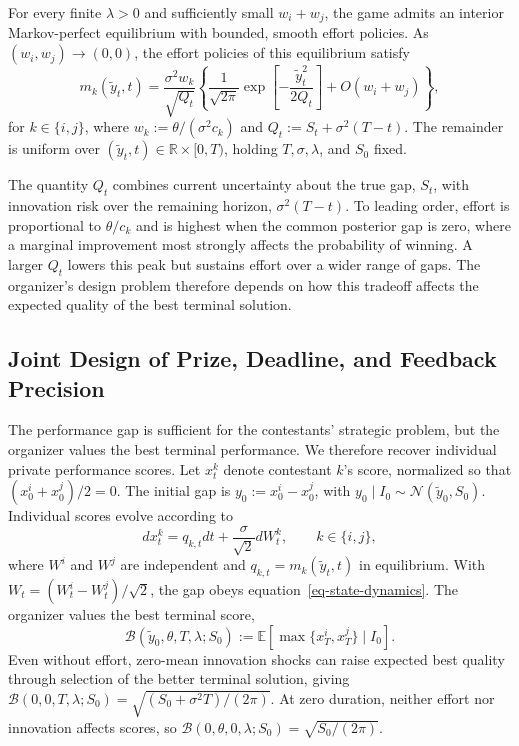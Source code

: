 \documentclass[mnsc]{informs3}
\begin{document}
\begin{theorem}\label{thm-equilibrium-effort}
{For every finite $\lambda>0$ and sufficiently small $w_i+w_j$, the game admits an interior Markov-perfect equilibrium with bounded, smooth effort policies. As $(w_i,w_j)\to(0,0)$, the effort policies of this equilibrium satisfy}
\begin{equation}\label{eq-equilibrium-effort}
m_k(\tilde y_t,t)
=\frac{\sigma^2w_k}{\sqrt{Q_t}}
\left\{
\frac{1}{\sqrt{2\pi}}
\exp\!\left[-\frac{\tilde y_t^2}{2Q_t}\right]
+O(w_i+w_j)
\right\},
\end{equation}
for $k\in\{i,j\}$, where $w_k:=\theta/(\sigma^2c_k)$ and $Q_t:=S_t+\sigma^2(T-t)$. The remainder is uniform over $(\tilde y_t,t)\in\mathbb R\times[0,T)$, holding $T,\sigma,\lambda$, and $S_0$ fixed.
\end{theorem}

{The quantity $Q_t$ combines current uncertainty about the true gap, $S_t$, with innovation risk over the remaining horizon, $\sigma^2(T-t)$. To leading order, effort is proportional to $\theta/c_k$ and is highest when the common posterior gap is zero, where a marginal improvement most strongly affects the probability of winning. A larger $Q_t$ lowers this peak but sustains effort over a wider range of gaps.}
The organizer's design problem therefore depends on how this tradeoff affects the expected quality of the best terminal solution.

\subsection{{Joint Design of Prize, Deadline, and Feedback Precision}}\label{sect-design}


The performance gap is sufficient for the contestants' strategic problem, but the organizer values the best terminal performance. We therefore recover individual private performance scores. Let $x_t^k$ denote contestant $k$'s score, normalized so that $(x_0^i+x_0^j)/2=0$. The initial gap is $y_0:=x_0^i-x_0^j$, with $y_0\mid I_0\sim\mathcal N(\tilde y_0,S_0)$.
Individual scores evolve according to
\begin{equation}\label{eq-individual-output-dynamics}
dx_t^k=q_{k,t}dt+\frac{\sigma}{\sqrt2}dW_t^k,
\qquad k\in\{i,j\},
\end{equation}
where $W^i$ and $W^j$ are independent and $q_{k,t}=m_k(\tilde y_t,t)$ in equilibrium. With $W_t=(W_t^i-W_t^j)/\sqrt2$, the gap obeys equation~\eqref{eq-state-dynamics}. The organizer values the best terminal score,
\[
\mathcal B(\tilde y_0,\theta,T,\lambda;S_0)
:=\mathbb E[\max\{x_T^i,x_T^j\}\mid I_0].
\]
Even without effort, zero-mean innovation shocks can raise expected best quality through selection of the better terminal solution, giving $\mathcal B(0,0,T,\lambda;S_0)=\sqrt{(S_0+\sigma^2T)/(2\pi)}$. At zero duration, neither effort nor innovation affects scores, so $\mathcal B(0,\theta,0,\lambda;S_0)=\sqrt{S_0/(2\pi)}$.
\end{document}
